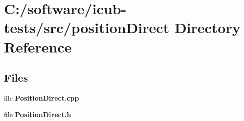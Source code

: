 \section{C\+:/software/icub-\/tests/src/position\+Direct Directory Reference}
\label{dir_de7c96bd180ef87bf5425ed419472c36}
\subsection*{Files}
\begin{DoxyCompactItemize}
\item 
file {\bfseries Position\+Direct.\+cpp}
\item 
file {\bfseries Position\+Direct.\+h}
\end{DoxyCompactItemize}
